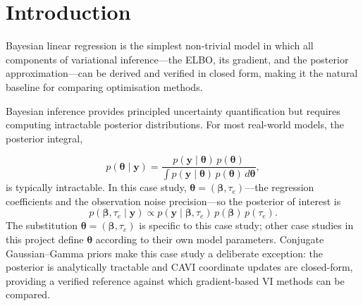 \documentclass[11pt,a4paper]{article}
\begin{document}
\begin{abstract}
The comparison is not limited to ELBO convergence. The methods are also compared on runtime, iteration count, posterior mean accuracy, and posterior standard-deviation ratios against the analytical posterior and a Gibbs sampler reference. A secondary experiment adds entropy regularisation to the ELBO to test whether explicitly rewarding broader covariance estimates can reduce posterior variance collapse.

The central question is therefore not only which method maximises the ELBO. It is also whether the resulting approximation remains honest about uncertainty. This distinction is the main reason for using the linear model first: the posterior, CAVI baseline, and Gibbs reference can all be checked in the same setting before moving to less tractable models.
\end{abstract}

\newpage
\section*{Introduction}

Bayesian linear regression is the simplest non-trivial model in which all components
of variational inference---the ELBO, its gradient, and the posterior approximation---can
be derived and verified in closed form, making it the natural baseline for comparing
optimisation methods.

Bayesian inference provides principled uncertainty quantification but requires computing intractable posterior distributions. For most real-world models, the posterior integral,

\begin{equation*}
    p(\bm{\theta} \mid \bm{y}) = \frac{p(\bm{y} \mid \bm{\theta})\,p(\bm{\theta})}{\displaystyle\int p(\bm{y} \mid \bm{\theta})\,p(\bm{\theta})\, d\bm{\theta}},
\end{equation*}
\noindent 
is typically intractable.
In this case study, $\bm{\theta} = (\bm{\beta}, \tau_e)$---the regression coefficients
and the observation noise precision---so the posterior of interest is
\begin{equation*}
    p(\bm{\beta}, \tau_e \mid \bm{y}) \propto p(\bm{y} \mid \bm{\beta}, \tau_e)\,p(\bm{\beta})\,p(\tau_e).
\end{equation*}
The substitution $\bm{\theta} = (\bm{\beta}, \tau_e)$ is specific to this case study;
other case studies in this project define $\bm{\theta}$ according to their own model parameters.
Conjugate Gaussian--Gamma priors make this case study a deliberate exception: the posterior
is analytically tractable and CAVI coordinate updates are closed-form, providing a verified
reference against which gradient-based VI methods can be compared.
\end{document}
